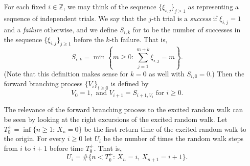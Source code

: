 \documentclass[reqno,letterpaper,11pt]{amsart}
\theoremstyle{remark}
\theoremstyle{definition}
\begin{document}
For each fixed $i \in {\mathbb Z}$, we may think of the sequence $\{ \xi_{i,j} \}_{j\geq 1}$ as representing a sequence of independent trials. We say that the $j$-th trial is a \emph{success} if $\xi_{i,j} = 1$ and a \emph{failure} otherwise, and we define $S_{i,k}$ for to be the number of successes in the sequence $\{\xi_{i,j}\}_{j\geq 1}$ before the $k$-th failure. That is, 
\[
 S_{i,k} = \min \left\{ m \geq 0: \, \sum_{j=1}^{m+k} \xi_{i,j} = m \right\}. 
\]
(Note that this definition makes sense for $k=0$ as well with $S_{i,0} = 0$.) 
Then the forward branching process $\{V_i\}_{i\geq 0}$ is defined by 
\begin{equation}\label{fbpdef}
V_0 = 1, \text{ and } V_{i+1} = S_{i+1,V_i} \text{ for } i\geq 0. 
\end{equation}

The relevance of the forward branching process to the excited random walk can be seen by looking at the right excursions of the excited random walk. 
Let $T_0^+ = \inf \{ n\geq 1: \, X_n = 0 \}$ be the first return time of the excited random walk to the origin. 
For every $i\geq 0$ let $U_i$ be the number of times the random walk steps from $i$ to $i+1$ before time $T_0^+$. That is, 
\[
 U_i = \# \{ n < T_0^+ : \, X_n = i, \, X_{n+1} = i+1 \}. 
\]
\end{document}
